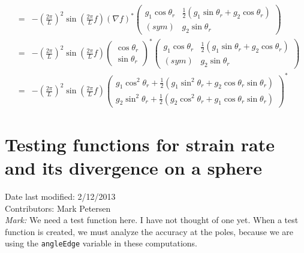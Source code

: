 \documentclass[11pt]{report}
\begin{document}
\begin{eqnarray}
&=& -\left(\frac{2\pi}{L}\right)^2
\sin{\left(\frac{2\pi}{L}f\right)}\left( \nabla f \right)^* 
\left(\begin{array}{cc} g_1\cos{\theta_r} & \frac{1}{2}\left( g_1\sin{\theta_r} + g_2\cos{\theta_r} \right)\\
                      (sym) & g_2\sin{\theta_r}  \end{array} \right)\\
&=& -\left(\frac{2\pi}{L}\right)^2
\sin{\left(\frac{2\pi}{L}f\right)}
\left( \begin{array}{c} \cos{\theta_r} \\ \sin{\theta_r} \end{array}    \right)  ^* 
\left(\begin{array}{cc} g_1\cos{\theta_r} & \frac{1}{2}\left( g_1\sin{\theta_r} + g_2\cos{\theta_r} \right)\\
                      (sym) & g_2\sin{\theta_r}  \end{array} \right)\\
&=& -\left(\frac{2\pi}{L}\right)^2
\sin{\left(\frac{2\pi}{L}f\right)}
\left(\begin{array}{c} g_1\cos^2{\theta_r} + \frac{1}{2}\left( g_1\sin^2{\theta_r} + g_2\cos{\theta_r}\sin{\theta_r} \right)\\
                       g_2\sin^2{\theta_r} + \frac{1}{2}\left( g_2\cos^2{\theta_r} + g_1\cos{\theta_r}\sin{\theta_r} \right) 
 \end{array} \right)^* 
\end{eqnarray}

\section{Testing functions for strain rate and its divergence on a sphere}
Date last modified: 2/12/2013 \\
Contributors: Mark Petersen \\

{\it Mark:} We need a test function here.  I have not thought of one yet.  When a test function is created, we must analyze the accuracy at the poles, because we are using the \verb|angleEdge| variable in these computations.




\end{document}
